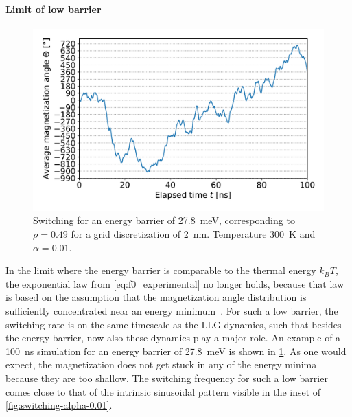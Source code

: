 \documentclass[11pt,a4paper,english]{article}
\begin{document}
\paragraph{Limit of low barrier}
\begin{figure}
    \centering
    \includegraphics[width=0.8\columnwidth]{Figures/biaxial_island/Switching/49x100_300K_alpha0.01_100ns_2nm.pdf}
    \caption{Switching for an energy barrier of \SI{27.8}{\milli\electronvolt}, corresponding to $\rho=0.49$ for a grid discretization of \SI{2}{\nano\metre}. Temperature \SI{300}{\kelvin} and $\alpha = 0.01$.}
    \label{fig:switching-49x100-300}
\end{figure}
In the limit where the energy barrier is comparable to the thermal energy $k_B T$, the exponential law from \cref{eq:f0_experimental} no longer holds, because that law is based on the assumption that the magnetization angle distribution is sufficiently concentrated near an energy minimum~\cite{ThermFluc_SingleDomain}.
For such a low barrier, the switching rate is on the same timescale as the LLG dynamics, such that besides the energy barrier, now also these dynamics play a major role. An example of a \SI{100}{\nano\second} simulation for an energy barrier of \SI{27.8}{\milli\electronvolt} is shown in \cref{fig:switching-49x100-300}. As one would expect, the magnetization does not get stuck in any of the energy minima because they are too shallow. The switching frequency for such a low barrier comes close to that of the intrinsic sinusoidal pattern visible in the inset of \cref{fig:switching-alpha-0.01}.


\clearpage
\end{document}

